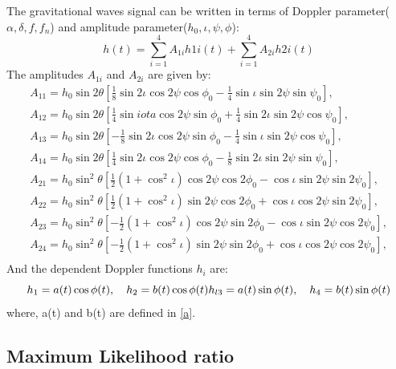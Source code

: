 \documentclass{ttuthes2007}
\begin{document}
The gravitational waves signal can be written in terms of Doppler
parameter($\alpha, \delta, f, f_n $) and amplitude parameter($h_0, \iota, \psi,
\phi$):
\begin{equation}
h(t) = \sum_{i=1}^{4}A_{1i} h{1i}(t) + \sum_{i=1}^{4} A_{2i} h{2i}(t)
\end{equation}
The amplitudes $A_{1i}$ and $A_{2i}$ are given by:
\begin{align*}
A_{11} = h_0 \sin{2\theta}\left[\frac{1}{8} \sin{2\iota}\cos{2\psi}\cos{\phi_0}-
\frac{1}{4}\sin{\iota} \sin{2\psi}\sin{\psi_0}\right], \\
A_{12} = h_0 \sin{2\theta}\left[\frac{1}{4} \sin{iota}\cos{2\psi}\sin{\phi_0}+
\frac{1}{4}\sin{2\iota} \sin{2\psi}\cos{\psi_0}\right], \\
A_{13} = h_0 \sin{2\theta}\left[-\frac{1}{8} \sin{2\iota}\cos{2\psi}\sin{\phi_0}
-\frac{1}{4}\sin{\iota} \sin{2\psi}\cos{\psi_0}\right], \\
A_{14} = h_0 \sin{2\theta}\left[\frac{1}{4} \sin{2\iota}\cos{2\psi}\cos{\phi_0}-
\frac{1}{8}\sin{2\iota} \sin{2\psi}\sin{\psi_0}\right], \\
A_{21} = h_0 \sin^2{\theta}\left[\frac{1}{2}
(1+\cos^2{\iota})\cos{2\psi}\cos{2\phi_0}- \cos{\iota} \sin{2\psi}\sin{2\psi_0}\right], \\
A_{22} = h_0 \sin^2{\theta}\left[\frac{1}{2}
(1+\cos^2{\iota})\sin{2\psi}\cos{2\phi_0} + \cos{\iota} \cos{2\psi}\sin{2\psi_0}\right], \\
A_{23} = h_0 \sin^2{\theta}\left[-\frac{1}{2}
(1+\cos^2{\iota})\cos{2\psi}\sin{2\phi_0}- \cos{\iota} \sin{2\psi}\cos{2\psi_0}\right], \\
A_{24} = h_0 \sin^2{\theta}\left[-\frac{1}{2}
(1+\cos^2{\iota})\sin{2\psi}\sin{2\phi_0} + \cos{\iota} \cos{2\psi}\cos{2\psi_0}\right], \\
\end{align*}
And the dependent Doppler functions $h_{i}$ are:
\begin{equation}\label{h}
h_{1}=a(t) \cos{\phi(t)},\quad h_{2}=b(t) \cos{\phi(t)}\\ 
h_{l3}=a(t) \sin{\phi(t)},\quad h_{4}=b(t) \sin{\phi(t)} 
\end{equation}
where, a(t) and b(t) are defined in \ref{a}.



\subsection{Maximum Likelihood ratio}
\end{document}
